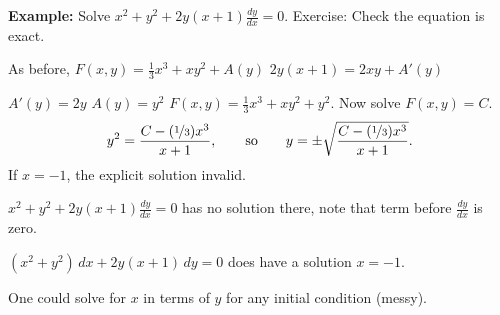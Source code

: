 \documentclass[10pt,aspectratio=169]{beamer}
\begin{document}
\begin{frame}

\textbf{Example:}
Solve
\quad
$x^2+y^2 + 2y(x+1) \frac{dy}{dx} = 0$.
\qquad
\pause
Exercise:
Check the equation is exact.

\medskip
\pause

As before,
\quad
$F(x,y) = \frac{1}{3}x^3 + xy^2 + A(y)$
\pause
\wthus
$2y(x+1) = 2xy + A'(y)$

\medskip
\pause

\thus \quad $A'(y)=2y$
\pause
\wthus
$A(y) = y^2$
\pause
\wthus
$F(x,y) = \frac{1}{3}x^3 + xy^2 + y^2$.
\quad
\pause
Now solve $F(x,y) = C$.
\pause
\begin{equation*}
y^2 = \frac{C-(\nicefrac{1}{3})x^3}{x+1},
\qquad \text{so} \qquad
y = \pm \sqrt{\frac{C-(\nicefrac{1}{3})x^3}{x+1}} .
\end{equation*}
If $x=-1$, the explicit solution invalid.

\medskip
\pause

$x^2+y^2 + 2y(x+1) \frac{dy}{dx} = 0$ has no solution there,
note that term before
$\frac{dy}{dx}$ is zero.

\medskip
\pause

$(x^2+y^2) \, dx + 2y(x+1) \, dy = 0$ does have a solution $x=-1$.

\medskip
\pause

One could solve for $x$ in terms of $y$ for any initial condition (messy).
\end{frame}
\end{document}
